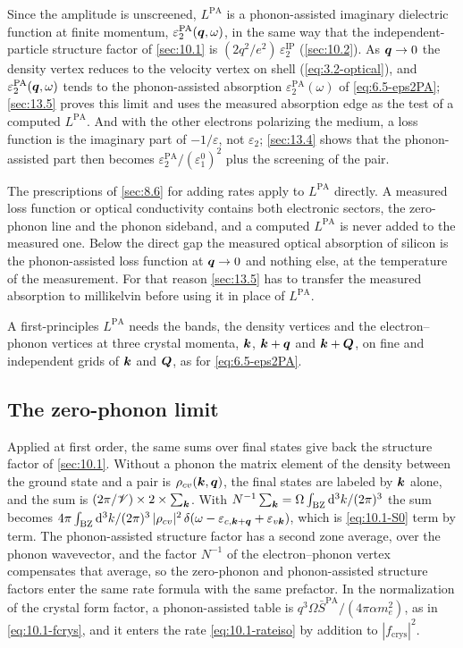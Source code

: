 Since the amplitude is unscreened, $L^{\mathrm{PA}}$ is a phonon-assisted imaginary dielectric function at finite momentum, $\varepsilon_2^{\mathrm{PA}}(\bm{q},\omega)$, in the same way that the independent-particle structure factor of \cref{sec:10.1} is $(2q^2/e^2)\,\varepsilon_2^{\mathrm{IP}}$ (\cref{sec:10.2}). As $\bm{q} \to 0$ the density vertex reduces to the velocity vertex on shell (\cref{eq:3.2-optical}), and $\varepsilon_2^{\mathrm{PA}}(\bm{q},\omega)$ tends to the phonon-assisted absorption $\varepsilon_2^{\mathrm{PA}}(\omega)$ of \cref{eq:6.5-eps2PA}; \cref{sec:13.5} proves this limit and uses the measured absorption edge as the test of a computed $L^{\mathrm{PA}}$. And with the other electrons polarizing the medium, a loss function is the imaginary part of $-1/\varepsilon$, not $\varepsilon_2$; \cref{sec:13.4} shows that the phonon-assisted part then becomes $\varepsilon_2^{\mathrm{PA}}/(\varepsilon_1^0)^2$ plus the screening of the pair.

The prescriptions of \cref{sec:8.6} for adding rates apply to $L^{\mathrm{PA}}$ directly. A measured loss function or optical conductivity contains both electronic sectors, the zero-phonon line and the phonon sideband, and a computed $L^{\mathrm{PA}}$ is never added to the measured one. Below the direct gap the measured optical absorption of silicon is the phonon-assisted loss function at $\bm{q} \to 0$ and nothing else, at the temperature of the measurement. For that reason \cref{sec:13.5} has to transfer the measured absorption to millikelvin before using it in place of $L^{\mathrm{PA}}$.

A first-principles $L^{\mathrm{PA}}$ needs the bands, the density vertices and the electron--phonon vertices at three crystal momenta, $\bm{k}$, $\bm{k}+\bm{q}$ and $\bm{k}+\bm{Q}$, on fine and independent grids of $\bm{k}$ and $\bm{Q}$, as for \cref{eq:6.5-eps2PA}.

\subsection{The zero-phonon limit}

Applied at first order, the same sums over final states give back the structure factor of \cref{sec:10.1}. Without a phonon the matrix element of the density between the ground state and a pair is $\rho_{cv}(\bm{k},\bm{q})$, the final states are labeled by $\bm{k}$ alone, and the sum is $(2\pi/\mathscr{V})\times2\times\sum_{\bm{k}}$. With $N^{-1}\sum_{\bm{k}} = \Omega\int_{\mathrm{BZ}}\mathrm{d}^3k/(2\pi)^3$ the sum becomes $4\pi\int_{\mathrm{BZ}}\mathrm{d}^3k/(2\pi)^3\,|\rho_{cv}|^2\,\delta(\omega - \varepsilon_{c,\bm{k}+\bm{q}} + \varepsilon_{v\bm{k}})$, which is \cref{eq:10.1-S0} term by term. The phonon-assisted structure factor has a second zone average, over the phonon wavevector, and the factor $N^{-1}$ of the electron--phonon vertex compensates that average, so the zero-phonon and phonon-assisted structure factors enter the same rate formula with the same prefactor. In the normalization of the crystal form factor, a phonon-assisted table is $q^3\Omega\bar S^{\mathrm{PA}}/(4\pi\alpha m_e^2)$, as in \cref{eq:10.1-fcrys}, and it enters the rate \cref{eq:10.1-rateiso} by addition to $|f_{\mathrm{crys}}|^2$.

